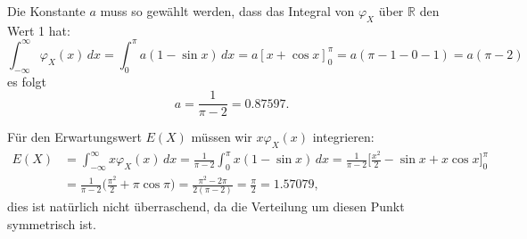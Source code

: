 \begin{loesung}
\begin{teilaufgaben}
\item Die Konstante $a$ muss so gewählt werden, dass das Integral von
$\varphi_X$ über $\mathbb R$ den Wert 1 hat:
\[
\int_{-\infty}^{\infty}\varphi_X(x)\,dx
=
\int_0^\pi a(1-\sin x)\,dx
=
a[x+\cos x]_0^\pi
=
a(\pi - 1 - 0 - 1) = a(\pi-2)
\]
es folgt
\[
a=\frac1{\pi -2}=0.87597.
\]
\item
Für den Erwartungswert $E(X)$ müssen wir $x\varphi_X(x)$ integrieren:
\begin{align*}
E(X)
&=
\int_{-\infty}^\infty x\varphi_X(x)\,dx
=
\frac1{\pi-2}\int_0^\pi x(1-\sin x)\,dx
=
\frac1{\pi - 2} \biggl[\frac{x^2}{2}-\sin x + x\cos x\biggr]_0^\pi
\\
&=
\frac1{\pi - 2}\biggl(\frac{\pi^2}{2} +\pi\cos\pi\biggr)
=
\frac{\pi^2-2\pi}{2(\pi-2)}=\frac{\pi}{2} = 1.57079,
\end{align*}
dies ist natürlich nicht überraschend, da die Verteilung um diesen
Punkt symmetrisch ist.


\end{teilaufgaben}
\end{loesung}
